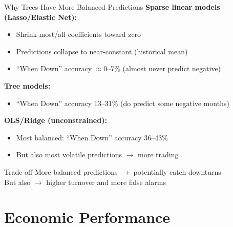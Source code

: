 \documentclass[10pt]{beamer}
\begin{document}
\begin{frame}{Why Trees Have More Balanced Predictions}
  \textbf{Sparse linear models (Lasso/Elastic Net):}
  \begin{itemize}
    \item Shrink most/all coefficients toward zero
    \item Predictions collapse to near-constant (historical mean)
    \item ``When Down'' accuracy $\approx 0$--7\% (almost never predict negative)
  \end{itemize}

  \vspace{0.5em}
  \textbf{Tree models:}
  \begin{itemize}
    \item ``When Down'' accuracy 13--31\% (do predict some negative months)
  \end{itemize}

  \vspace{0.5em}
  \textbf{OLS/Ridge (unconstrained):}
  \begin{itemize}
    \item Most balanced: ``When Down'' accuracy 36--43\%
    \item But also most volatile predictions $\to$ more trading
  \end{itemize}

  \vspace{0.5em}
  \begin{block}{Trade-off}
    More balanced predictions $\to$ potentially catch downturns\\
    But also $\to$ higher turnover and more false alarms
  \end{block}
\end{frame}

\section{Economic Performance}
\end{document}

